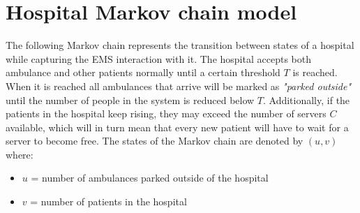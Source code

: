 \section{Hospital Markov chain model}
The following Markov chain represents the transition between states of a hospital while capturing the EMS interaction with it. The hospital accepts both ambulance and other patients normally until a certain threshold \(T\) is reached. When it is reached all ambulances that arrive will be marked as \textit{"parked outside"} until the number of people in the system is reduced below \(T\). Additionally, if the patients in the hospital keep rising, they may exceed the number of servers \(C\) available, which will in turn mean that every new patient will have to wait for a server to become free. The states of the Markov chain are denoted by \((u,v)\) where:

\begin{itemize}
    \item \(u\) = number of ambulances parked outside of the hospital
    \item \(v\) = number of patients in the hospital
\end{itemize}

